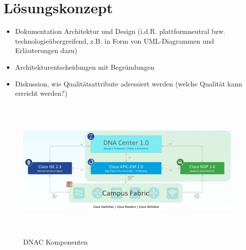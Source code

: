 \section{Lösungskonzept}

\begin{itemize}	
	\item Dokumentation Architektur und Design (i.d.R. plattformneutral bzw. technologieübergreifend, z.B. in Form von UML-Diagrammen und Erläuterungen dazu) 
	\item Architekturentscheidungen mit Begründungen
	\item Diskussion, wie Qualitätsattribute adressiert werden (welche Qualität kann erreicht werden?)
\end{itemize}


\begin{figure}[H]
	\centering
	\includegraphics[height=7cm]{img/DNAC-Components.JPG}
	\caption{DNAC Komponenten}
	\label{fig:DNAC Komponenten}
\end{figure}
